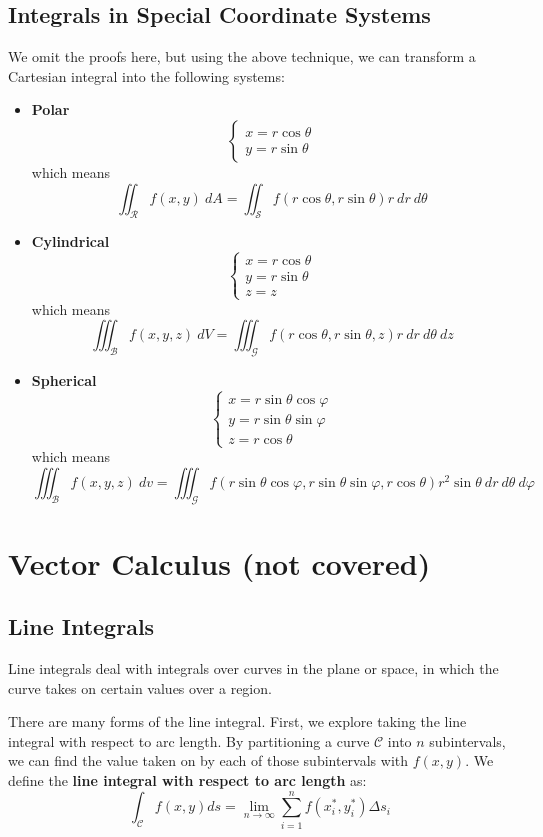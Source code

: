 \documentclass[12pt]{article}
\begin{document}
\subsection{Integrals in Special Coordinate Systems}
We omit the proofs here, but using the above technique, we can transform a Cartesian integral into the following systems:
\begin{itemize}
\item \textbf{Polar} \[ \begin{cases} x = r\cos{\theta} \\ y = r\sin{\theta} \end{cases} \] which means \[ \iint_{\mathcal{R}}f(x,y) \ dA = \iint_{\mathcal{S}}f(r\cos{\theta},r\sin{\theta}) r \ dr \ d\theta\]
\item \textbf{Cylindrical} \[ \begin{cases} x = r\cos{\theta} \\ y = r\sin{\theta} \\ z = z \end{cases} \] which means \[ \iiint_{\mathcal{B}} f(x,y,z) \ dV = \iiint_{\mathcal{G}}f(r\cos{\theta},r\sin{\theta},z) r \ dr \ d\theta \ dz \]
\item \textbf{Spherical} \[ \begin{cases} x = r\sin{\theta}\cos{\varphi} \\ y = r\sin{\theta}\sin{\varphi} \\ z = r\cos{\theta} \end{cases} \] which means \[ \iiint_{\mathcal{B}} f(x,y,z) \ dv = \iiint_{\mathcal{G}}f(r\sin{\theta}\cos{\varphi},r\sin{\theta}\sin{\varphi},r\cos{\theta}) r^2\sin{\theta} \ dr \ d\theta \ d\varphi \]
\end{itemize}
\section{Vector Calculus (not covered)} %

\subsection{Line Integrals}
Line integrals deal with integrals over curves in the plane or space, in which the curve takes on certain values over a region. 

There are many forms of the line integral. First, we explore taking the line integral with respect to arc length. By partitioning a curve $\mathcal{C}$ into $n$ subintervals, we can find the value taken on by each of those subintervals with $f(x,y)$. We define the \textbf{line integral with respect to arc length} as: \[ \int_{\mathcal{C}}f(x,y) ds = \lim_{n \to \infty}\sum_{i=1}^nf(x_i^*,y_i^*)\Delta s_i \]
\end{document}
